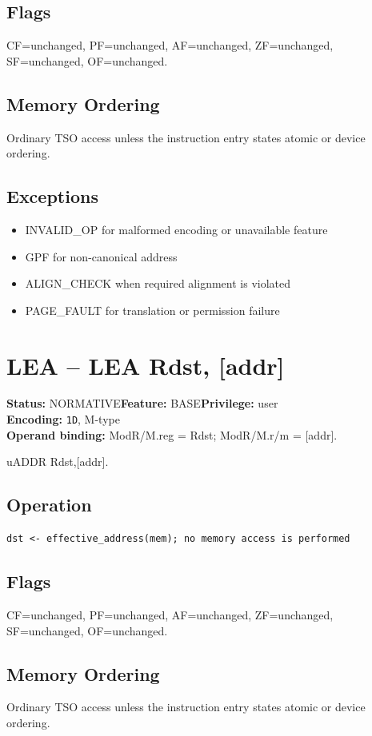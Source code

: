 \documentclass[10pt]{article}
\begin{document}
\subsection*{Flags}
CF=unchanged, PF=unchanged, AF=unchanged, ZF=unchanged, SF=unchanged, OF=unchanged.
\subsection*{Memory Ordering}
Ordinary TSO access unless the instruction entry states atomic or device ordering.
\subsection*{Exceptions}
\begin{itemize}
\item INVALID\_OP for malformed encoding or unavailable feature
\item GPF for non-canonical address
\item ALIGN\_CHECK when required alignment is violated
\item PAGE\_FAULT for translation or permission failure
\end{itemize}
\clearpage

\section{LEA -- LEA Rdst, [addr]}
\textbf{Status:} NORMATIVE\quad \textbf{Feature:} BASE\quad \textbf{Privilege:} user\\
\textbf{Encoding:} \texttt{1D}, M-type\\
\textbf{Operand binding:} ModR/M.reg = Rdst; ModR/M.r/m = [addr].

uADDR Rdst,[addr].

\subsection*{Operation}
\begin{lstlisting}
dst <- effective_address(mem); no memory access is performed
\end{lstlisting}
\subsection*{Flags}
CF=unchanged, PF=unchanged, AF=unchanged, ZF=unchanged, SF=unchanged, OF=unchanged.
\subsection*{Memory Ordering}
Ordinary TSO access unless the instruction entry states atomic or device ordering.
\end{document}
